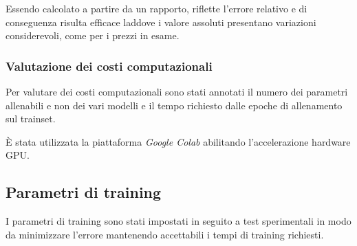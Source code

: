 Essendo calcolato a partire da un rapporto, riflette l'errore relativo e di
conseguenza risulta efficace laddove i valore assoluti presentano variazioni
considerevoli, come per i prezzi in esame.


\subsubsection{Valutazione dei costi computazionali}

Per valutare dei costi computazionali sono stati annotati il numero dei
parametri allenabili e non dei vari modelli e il tempo richiesto dalle epoche di
allenamento sul trainset.

È stata utilizzata la piattaforma \textit{Google Colab} abilitando l'accelerazione hardware GPU.

\subsection{Parametri di training}

I parametri di training sono stati impostati in seguito a test sperimentali in
modo da minimizzare l'errore mantenendo accettabili i tempi di training richiesti.
